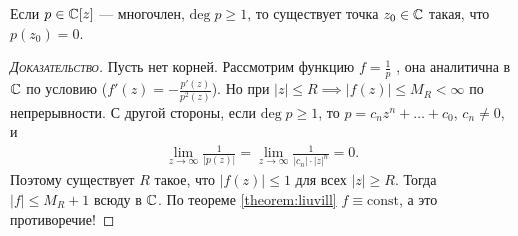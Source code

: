 \documentclass[../complex-analysis.tex]{subfiles}
\begin{document}
\begin{thm}
 Если $ p \in \mathbb{C}[z] $ --- многочлен, $ \mathrm{deg}\;p \geqslant 1 $, то существует точка $ z_0 \in \mathbb{C} $ такая, что $ p(z_0) = 0 $.
\end{thm}
\begin{proof}[\normalfont\textsc{Доказательство}]
 Пусть нет корней. Рассмотрим функцию $ f = \frac{1}{p} $ , она аналитична в $ \mathbb{C} $  по условию ($ f'(z) = -\frac{p'(z)}{p^{2}(z)} $). Но при $ \left| z \right| \leqslant R \implies \left| f(z) \right| \leqslant M_R < \infty $ по непрерывности. С другой стороны, если $ \mathrm{deg}\;p \geqslant 1 $, то $ p = c_n z^{n} + \ldots + c_0 $, $ c_n \neq 0 $, и 
 \begin{align*}
  \lim_{z \to \infty} \frac{1}{\left| p(z) \right|} = \lim_{z \to \infty} \frac{1}{\left| c_n \right| \cdot \left| z \right|^{n}} = 0.
 \end{align*} Поэтому существует $ R $ такое, что $ \left| f(z) \right| \leqslant 1 $ для всех $ \left| z \right| \geqslant R $. Тогда $ \left| f \right| \leqslant M_R + 1 $ всюду в $ \mathbb{C} $. По теореме \ref{theorem:liuvill} $ f \equiv \mathrm{const} $, а это противоречие!
\end{proof}
\end{document}
